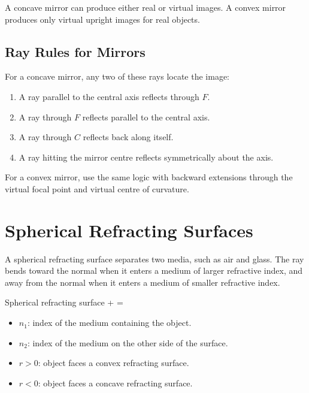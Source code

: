 \documentclass{studentnotes}
\begin{document}
\begin{importantnote}
    A concave mirror can produce either real or virtual images. A convex mirror
    produces only virtual upright images for real objects.
\end{importantnote}

\subsection{Ray Rules for Mirrors}

For a concave mirror, any two of these rays locate the image:

\begin{enumerate}
    \item A ray parallel to the central axis reflects through \(F\).
    \item A ray through \(F\) reflects parallel to the central axis.
    \item A ray through \(C\) reflects back along itself.
    \item A ray hitting the mirror centre reflects symmetrically about the axis.
\end{enumerate}

For a convex mirror, use the same logic with backward extensions through the
virtual focal point and virtual centre of curvature.

\section{Spherical Refracting Surfaces}

A spherical refracting surface separates two media, such as air and glass. The
ray bends toward the normal when it enters a medium of larger refractive index,
and away from the normal when it enters a medium of smaller refractive index.

\begin{namedformula}{Spherical refracting surface}
    +
    =
\end{namedformula}

\begin{itemize}
    \item \(n_1\): index of the medium containing the object.
    \item \(n_2\): index of the medium on the other side of the surface.
    \item \(r>0\): object faces a convex refracting surface.
    \item \(r<0\): object faces a concave refracting surface.
\end{itemize}
\end{document}
